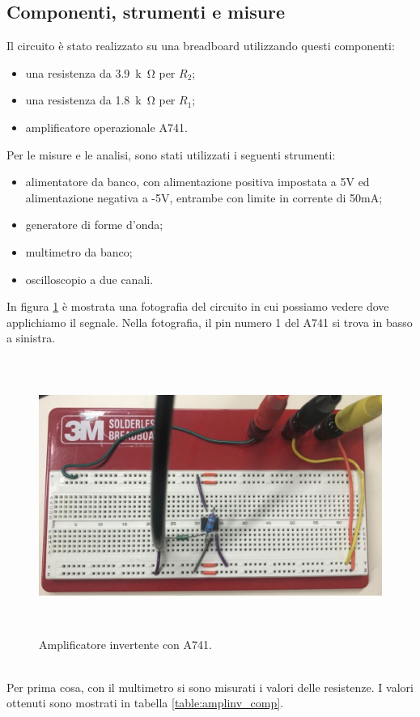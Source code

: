 \documentclass{report}
\begin{document}
\subsection{Componenti, strumenti e misure} 
Il circuito è stato realizzato su una breadboard utilizzando questi componenti:
\begin{itemize}
\item una resistenza da \SI{3.9}{k\ohm} per $R_2$;
\item una resistenza da \SI{1.8}{k\ohm} per $R_1$;
\item amplificatore operazionale \textmu A741.
\end{itemize}
Per le misure e le analisi, sono stati utilizzati i seguenti strumenti:
\begin{itemize}
\item alimentatore da banco, con alimentazione positiva impostata a 5V ed alimentazione negativa a -5V, entrambe con limite in corrente di 50mA;
\item generatore di forme d'onda;
\item multimetro da banco;
\item oscilloscopio a due canali.
\end{itemize}
In figura \ref{figura:foto_amplinv} è mostrata una fotografia del circuito in cui possiamo vedere dove applichiamo il segnale. Nella fotografia, il pin numero 1 del \textmu A741 si trova in basso a sinistra.
\begin{figure}[h]
\centering
\includegraphics[height=9cm]{immagini/foto_amplinv}
\caption{Amplificatore invertente con \textmu A741.}
\label{figura:foto_amplinv}
\end{figure}
\\Per prima cosa, con il multimetro si sono misurati i valori delle resistenze. I valori ottenuti sono mostrati in tabella \ref{table:amplinv_comp}.
\end{document}
